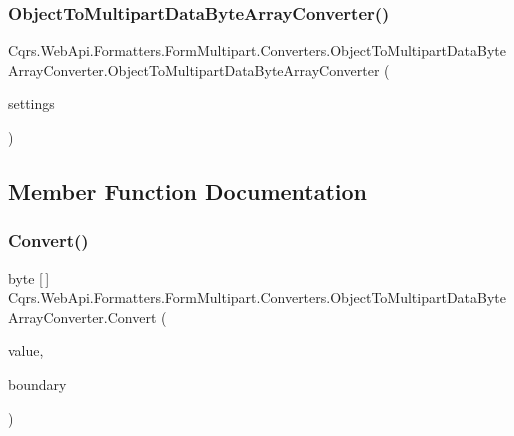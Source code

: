 \subsubsection{\texorpdfstring{Object\+To\+Multipart\+Data\+Byte\+Array\+Converter()}{ObjectToMultipartDataByteArrayConverter()}}
{\footnotesize\ttfamily Cqrs.\+Web\+Api.\+Formatters.\+Form\+Multipart.\+Converters.\+Object\+To\+Multipart\+Data\+Byte\+Array\+Converter.\+Object\+To\+Multipart\+Data\+Byte\+Array\+Converter (\begin{DoxyParamCaption}\item[{\hyperlink{classCqrs_1_1WebApi_1_1Formatters_1_1FormMultipart_1_1Infrastructure_1_1MultipartFormatterSettings}{Multipart\+Formatter\+Settings}}]{settings }\end{DoxyParamCaption})}



\subsection{Member Function Documentation}
\mbox{\label{classCqrs_1_1WebApi_1_1Formatters_1_1FormMultipart_1_1Converters_1_1ObjectToMultipartDataByteArrayConverter_af7bd8ac108a7e95f5961a14064595f84_af7bd8ac108a7e95f5961a14064595f84}} 
\subsubsection{\texorpdfstring{Convert()}{Convert()}}
{\footnotesize\ttfamily byte \mbox{[}$\,$\mbox{]} Cqrs.\+Web\+Api.\+Formatters.\+Form\+Multipart.\+Converters.\+Object\+To\+Multipart\+Data\+Byte\+Array\+Converter.\+Convert (\begin{DoxyParamCaption}\item[{object}]{value,  }\item[{string}]{boundary }\end{DoxyParamCaption})}


